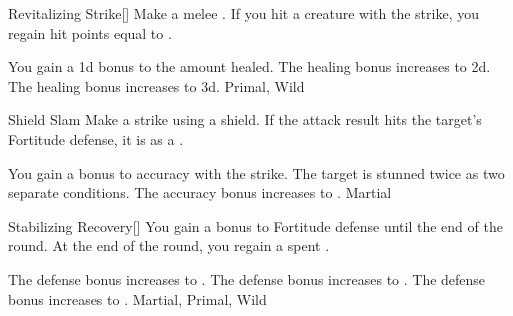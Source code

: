 \lowercase{\hypertarget{maneuver:Revitalizing Strike}{}}\label{maneuver:Revitalizing Strike}
\hypertarget{maneuver:Revitalizing Strike}{}
\begin{apability}{Revitalizing Strike}[]
Make a melee .
If you hit a creature with the strike, you regain hit points equal to .

\rankline
{} You gain a \plus1d bonus to the amount healed.
 The healing bonus increases to \plus2d.
 The healing bonus increases to \plus3d.
 Primal, Wild
\end{apability}
\vspace{0.25em}



\lowercase{\hypertarget{maneuver:Shield Slam}{}}\label{maneuver:Shield Slam}
\hypertarget{maneuver:Shield Slam}{}
\begin{apability}{Shield Slam}
Make a strike using a shield.
If the attack result hits the target's Fortitude defense,
it is  as a .

\rankline
{} You gain a  bonus to accuracy with the strike.
 The target is stunned twice as two separate conditions.
 The accuracy bonus increases to .
 Martial
\end{apability}
\vspace{0.25em}



\lowercase{\hypertarget{maneuver:Stabilizing Recovery}{}}\label{maneuver:Stabilizing Recovery}
\hypertarget{maneuver:Stabilizing Recovery}{}
\begin{freeability}{Stabilizing Recovery}[]
You gain a  bonus to Fortitude defense until the end of the round.
At the end of the round, you regain a spent .

\rankline
{} The defense bonus increases to .
 The defense bonus increases to .
 The defense bonus increases to .
 Martial, Primal, Wild
\end{freeability}
\vspace{0.25em}



